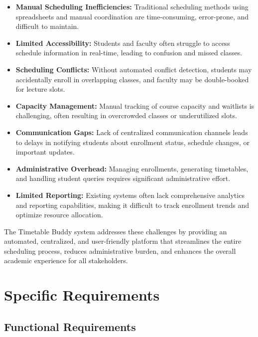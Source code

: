 \documentclass[12pt,a4paper]{report}
\begin{document}
\begin{itemize}[leftmargin=*]
    \item \textbf{Manual Scheduling Inefficiencies:} Traditional scheduling methods using spreadsheets and manual coordination are time-consuming, error-prone, and difficult to maintain.
    
    \item \textbf{Limited Accessibility:} Students and faculty often struggle to access schedule information in real-time, leading to confusion and missed classes.
    
    \item \textbf{Scheduling Conflicts:} Without automated conflict detection, students may accidentally enroll in overlapping classes, and faculty may be double-booked for lecture slots.
    
    \item \textbf{Capacity Management:} Manual tracking of course capacity and waitlists is challenging, often resulting in overcrowded classes or underutilized slots.
    
    \item \textbf{Communication Gaps:} Lack of centralized communication channels leads to delays in notifying students about enrollment status, schedule changes, or important updates.
    
    \item \textbf{Administrative Overhead:} Managing enrollments, generating timetables, and handling student queries requires significant administrative effort.
    
    \item \textbf{Limited Reporting:} Existing systems often lack comprehensive analytics and reporting capabilities, making it difficult to track enrollment trends and optimize resource allocation.
\end{itemize}

The Timetable Buddy system addresses these challenges by providing an automated, centralized, and user-friendly platform that streamlines the entire scheduling process, reduces administrative burden, and enhances the overall academic experience for all stakeholders.

\chapter{Specific Requirements}

\section{Functional Requirements}
\end{document}
